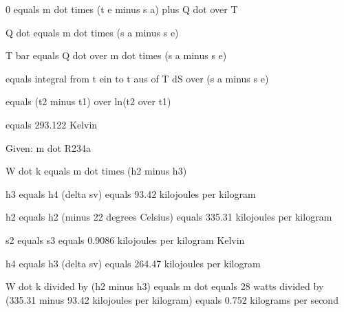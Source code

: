 0 equals m dot times (t e minus s a) plus Q dot over T

Q dot equals m dot times (s a minus s e)

T bar equals Q dot over m dot times (s a minus s e)

equals integral from t ein to t aus of T dS over (s a minus s e)

equals (t2 minus t1) over ln(t2 over t1)

equals 293.122 Kelvin

Given: m dot R234a

W dot k equals m dot times (h2 minus h3)

h3 equals h4 (delta sv) equals 93.42 kilojoules per kilogram

h2 equals h2 (minus 22 degrees Celsius) equals 335.31 kilojoules per kilogram

s2 equals s3 equals 0.9086 kilojoules per kilogram Kelvin

h4 equals h3 (delta sv) equals 264.47 kilojoules per kilogram

W dot k divided by (h2 minus h3) equals m dot equals 28 watts divided by (335.31 minus 93.42 kilojoules per kilogram) equals 0.752 kilograms per second